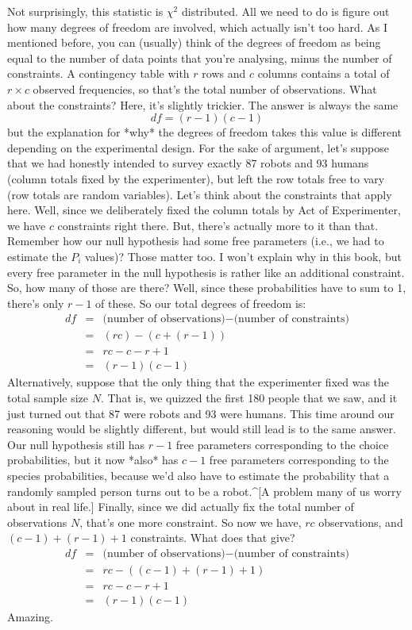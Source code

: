 Not surprisingly, this statistic is $\chi^2$ distributed. All we need to do is figure out how many degrees of freedom are involved, which actually isn't too hard. As I mentioned before, you can (usually) think of the degrees of freedom as being equal to the number of data points that you're analysing, minus the number of constraints. A contingency table with $r$ rows and $c$ columns contains a total of $r \times c$ observed frequencies, so that's the total number of observations. What about the constraints? Here, it's slightly trickier. The answer is always the same
$$
df = (r-1)(c-1)
$$
but the explanation for *why* the degrees of freedom takes this value is different depending on the experimental design. For the sake of argument, let's suppose that we had honestly intended to survey exactly 87 robots and 93 humans (column totals fixed by the experimenter), but left the row totals free to vary (row totals are random variables). Let's think about the constraints that apply here. Well, since we deliberately fixed the column totals by Act of Experimenter, we have $c$ constraints right there. But, there's actually more to it than that. Remember how our null hypothesis had some free parameters (i.e., we had to estimate the $P_i$ values)? Those matter too. I won't explain why in this book, but every free parameter in the null hypothesis is rather like an additional constraint. So, how many of those are there? Well, since these probabilities have to sum to 1, there's only $r-1$ of these. So our total degrees of freedom is:
$$
\begin{array}{rcl}
df &=& \mbox{(number of observations)} - \mbox{(number of constraints)} \\
&=& (rc) - (c + (r-1)) \\
&=& rc - c - r + 1 \\
&=& (r - 1)(c - 1)
\end{array}
$$
Alternatively, suppose that the only thing that the experimenter fixed was the total sample size $N$. That is, we quizzed the first 180 people that we saw, and it just turned out that 87 were robots and 93 were humans. This time around our reasoning would be slightly different, but would still lead is to the same answer. Our null hypothesis still has $r-1$ free parameters corresponding to the choice probabilities, but it now *also* has $c-1$ free parameters corresponding to the species probabilities, because we'd also have to estimate the probability that a randomly sampled person turns out to be a robot.^[A problem many of us worry about in real life.] Finally, since we did actually fix the total number of observations $N$, that's one more constraint. So now we have, $rc$ observations, and $(c-1) + (r-1) + 1$ constraints. What does that give?
$$
\begin{array}{rcl}
df &=& \mbox{(number of observations)} - \mbox{(number of constraints)} \\
&=& rc - ( (c-1) + (r-1) + 1) \\
&=& rc - c - r + 1 \\
&=& (r - 1)(c - 1)
\end{array}
$$
Amazing. 



